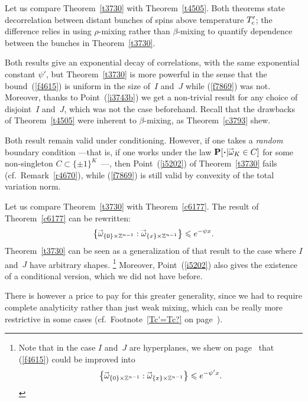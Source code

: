 \begin{Rmk}
Let us compare Theorem~\ref{t3730} with Theorem~\ref{t4505}.
Both theorems state decorrelation between distant bunches of spins
above temperature $T_{\mathrm{c}}'$; the difference relies in using $\rho$-mixing
rather than $\beta$-mixing to quantify dependence between the bunches
in Theorem~\ref{t3730}.

Both results give an exponential decay of correlations,
with the same exponential constant $\psi'$,
but Theorem~\ref{t3730} is more powerful
in the sense that the bound~(\ref{f4615}) is uniform in the size of~$I$ and~$J$
while (\ref{f7869}) was not.
Moreover, thanks to Point~(\ref{i3743b}) we get a non-trivial result
for any choice of disjoint~$I$ and~$J$, which was not the case beforehand.
Recall that the drawbacks of Theorem~\ref{t4505} were inherent to $\beta$-mixing,
as Theorem~\ref{c3793} shew.

Both result remain valid under conditioning.
However, if one takes a \emph{random} boundary condition%
—that is, if one works under the law $\Pr[\Bcdot|{\vec\omega_K\in C}]$
for some non-singleton $C \subset \{\pm1\}^K$\hbox{ —,}
then Point~(\ref{i5202}) of Theorem~\ref{t3730} fails (cf.\ Remark~\ref{r4670}),
while (\ref{f7869}) is still valid by convexity of the total variation norm.
\end{Rmk}

\begin{Rmk}
Let us compare Theorem~\ref{t3730} with Theorem~\ref{c6177}.
The result of Theorem~\ref{c6177} can be rewritten:
\[ \big\{ \vec\omega_{\{0\}\times\ZZ^{n-1}} : \vec\omega_{\{x\}\times\ZZ^{n-1}} \big\}
\leq e^{-\psi x} . \]
Theorem~\ref{t3730} can be seen as a generalization of that result
to the case where $I$ and~$J$ have arbitrary shapes.%
\footnote{Note that in the case $I$ and~$J$ are hyperplanes,
we shew on page~\pageref{parHyperplanesInIsingsModel}
that (\ref{f4615}) could be improved into
\[ \big\{ \vec\omega_{\{0\}\times\ZZ^{n-1}} : \vec\omega_{\{x\}\times\ZZ^{n-1}} \big\}
\leq e^{-\psi' x} .\]}
Moreover, Point~(\ref{i5202}) also gives the existence of a conditional version,
which we did not have before.

There is however a price to pay for this greater generality,
since we had to require complete analyticity rather than just weak mixing,
which can be really more restrictive in some cases
(cf.\ Footnote~\ref{Tc'=Tc?} on page~\pageref{Tc'=Tc?}).
\end{Rmk}

